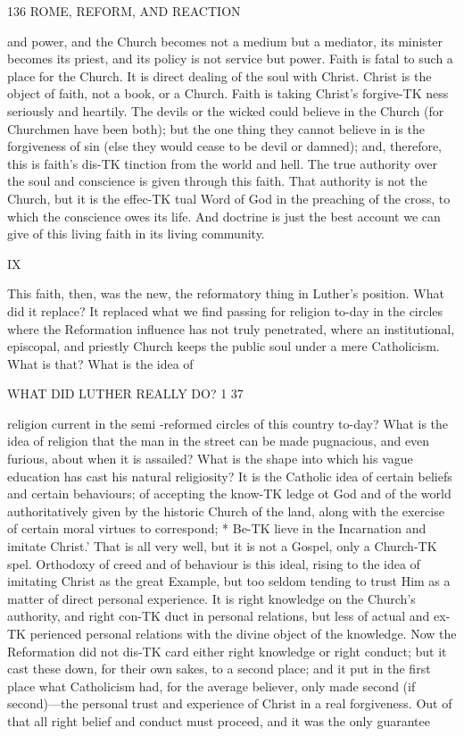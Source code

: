 \documentclass[12pt,a5paper,oneside]{book}
\begin{document}
{136 ROME, REFORM, AND REACTION 

and power, and the Church becomes not a medium 
but a mediator, its minister becomes its priest, and its 
policy is not service but power. Faith is fatal to such 
a place for the Church. It is direct dealing of the 
soul with Christ. Christ is the object of faith, not a 
book, or a Church. Faith is taking Christ's forgive-TK
ness seriously and heartily. The devils or the wicked 
could believe in the Church (for Churchmen have 
been both); but the one thing they cannot believe in 
is the forgiveness of sin (else they would cease to be 
devil or damned); and, therefore, this is faith's dis-TK
tinction from the world and hell. The true authority 
over the soul and conscience is given through this faith. 
That authority is not the Church, but it is the effec-TK
tual Word of God in the preaching of the cross, to 
which the conscience owes its life. And doctrine is 
just the best account we can give of this living faith 
in its living community. 

IX 

This faith, then, was the new, the reformatory 
thing in Luther's position. What did it replace? 
It replaced what we find passing for religion to-day in 
the circles where the Reformation influence has not 
truly penetrated, where an institutional, episcopal, and 
priestly Church keeps the public soul under a mere 
Catholicism. What is that? What is the idea of 



WHAT DID LUTHER REALLY DO? 1 37 

religion current in the semi -reformed circles of this 
country to-day? What is the idea of religion that 
the man in the street can be made pugnacious, and 
even furious, about when it is assailed? What is the 
shape into which his vague education has cast his 
natural religiosity? It is the Catholic idea of certain 
beliefs and certain behaviours; of accepting the know-TK
ledge ot God and of the world authoritatively given 
by the historic Church of the land, along with the 
exercise of certain moral virtues to correspond; * Be-TK
lieve in the Incarnation and imitate Christ.' That is 
all very well, but it is not a Gospel, only a Church-TK
spel. Orthodoxy of creed and of behaviour is this 
ideal, rising to the idea of imitating Christ as the 
great Example, but too seldom tending to trust Him 
as a matter of direct personal experience. It is right 
knowledge on the Church's authority, and right con-TK
duct in personal relations, but less of actual and ex-TK
perienced personal relations with the divine object of 
the knowledge. Now the Reformation did not dis-TK
card either right knowledge or right conduct; but 
it cast these down, for their own sakes, to a second 
place; and it put in the first place what Catholicism 
had, for the average believer, only made second (if 
second)---the personal trust and experience of Christ 
in a real forgiveness. Out of that all right belief and 
conduct must proceed, and it was the only guarantee 



}
\end{document}
